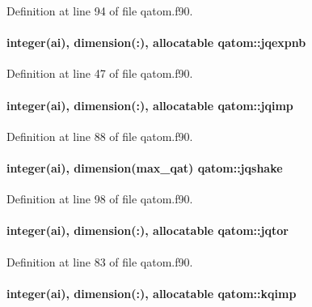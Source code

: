 Definition at line 94 of file qatom.\-f90.

\hypertarget{classqatom_a7d7c0be138a07450adc6f97ff114f3e9}{
\paragraph[{jqexpnb}]{\setlength{\rightskip}{0pt plus 5cm}integer(ai), dimension(\-:), allocatable qatom\-::jqexpnb}}\label{classqatom_a7d7c0be138a07450adc6f97ff114f3e9}


Definition at line 47 of file qatom.\-f90.

\hypertarget{classqatom_aec8261584efc3ec4cf10a8b4c030ffb5}{
\paragraph[{jqimp}]{\setlength{\rightskip}{0pt plus 5cm}integer(ai), dimension(\-:), allocatable qatom\-::jqimp}}\label{classqatom_aec8261584efc3ec4cf10a8b4c030ffb5}


Definition at line 88 of file qatom.\-f90.

\hypertarget{classqatom_a4f1103b4b5324b7f4f1e5fc06365984a}{
\paragraph[{jqshake}]{\setlength{\rightskip}{0pt plus 5cm}integer(ai), dimension({\bf max\-\_\-qat}) qatom\-::jqshake}}\label{classqatom_a4f1103b4b5324b7f4f1e5fc06365984a}


Definition at line 98 of file qatom.\-f90.

\hypertarget{classqatom_af6de1185567eec0f9322e4d6430a2d96}{
\paragraph[{jqtor}]{\setlength{\rightskip}{0pt plus 5cm}integer(ai), dimension(\-:), allocatable qatom\-::jqtor}}\label{classqatom_af6de1185567eec0f9322e4d6430a2d96}


Definition at line 83 of file qatom.\-f90.

\hypertarget{classqatom_ab4e982414614c382ce533e5a67a5b8a6}{
\paragraph[{kqimp}]{\setlength{\rightskip}{0pt plus 5cm}integer(ai), dimension(\-:), allocatable qatom\-::kqimp}}\label{classqatom_ab4e982414614c382ce533e5a67a5b8a6}


